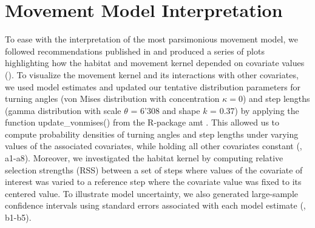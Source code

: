 \documentclass[abstract=off,10pt,a4paper,bibliography=totocnumbered]{article}
\begin{document}
\newpage
\section{Movement Model Interpretation}
To ease with the interpretation of the most parsimonious movement model, we
followed recommendations published in \cite{Fieberg.2020} and produced a series
of plots highlighting how the habitat and movement kernel depended on covariate
values (). To visualize the movement kernel and its
interactions with other covariates, we used model estimates and updated our
tentative distribution parameters for turning angles (von Mises distribution
with concentration \(\kappa = 0\)) and step lengths (gamma distribution with
scale \(\theta\) = 6'308 and shape \(k\) = 0.37) by applying the function
\textsf{update\_vonmises()} from the R-package \textsf{amt} \citep{Amt.2019}.
This allowed us to compute probability densities of turning angles and step
lengths under varying values of the associated covariates, while holding all
other covariates constant (, a1-a8). Moreover, we
investigated the habitat kernel by computing relative selection strengths (RSS)
between a set of steps where values of the covariate of interest was varied to a
reference step where the covariate value was fixed to its centered value. To
illustrate model uncertainty, we also generated large-sample confidence
intervals using standard errors associated with each model estimate
(, b1-b5).
\end{document}
